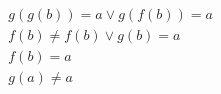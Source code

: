 \begin{align*}
%
& g(g(b)) = a \lor g(f(b)) = a
~\\~
& f(b)  \neq  f(b) \lor g(b) = a
~\\~
& f(b) = a
~\\~
& g(a)  \neq  a
%
\end{align*}
